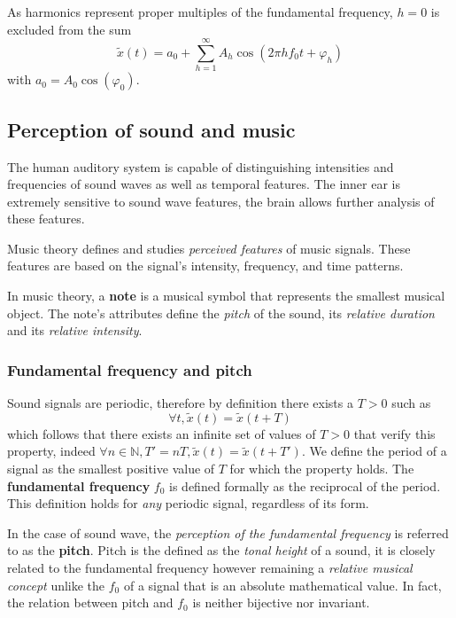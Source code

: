 \documentclass[american,]{article}
\begin{document}
As harmonics represent proper multiples of the fundamental
frequency, \(h=0\) is excluded from the sum
\[\tilde{x}(t) = a_0 + \sum_{h=1}^{\infty} A_h \cos(2\pi hf_0t + \varphi_h)\]
with \(a_0 = A_0\cos(\varphi_0)\).

\hypertarget{perception-of-sound-and-music}{%
\subsection{Perception of sound and music}\label{perception-of-sound-and-music}}

The human auditory system is capable of distinguishing
intensities and frequencies of sound waves as well as
temporal features.
The inner ear is extremely sensitive to sound wave features,
the brain allows further analysis of these features.

Music theory defines and studies \emph{perceived features}
of music signals.
These features are based on the signal's intensity,
frequency, and time patterns.

In music theory, a \textbf{note} is a musical symbol that
represents the smallest musical object.
The note's attributes define the \emph{pitch} of the sound, its
\emph{relative duration} and its \emph{relative intensity}.

\hypertarget{fundamental-frequency-and-pitch}{%
\subsubsection{Fundamental frequency and pitch}\label{fundamental-frequency-and-pitch}}

Sound signals are periodic, therefore by definition there
exists a \(T>0\) such as
\[\forall t, \tilde{x}(t)=\tilde{x}(t+T)\]
which follows that there exists an infinite set of values of \(T>0\) that verify this property, indeed
\(\forall n\in\mathbb{N}, T'=nT, \tilde{x}(t)=\tilde{x}(t+T')\).
We define the period of a signal as the smallest positive
value of \(T\) for which the property holds.
The \textbf{fundamental frequency} \(f_0\) is defined formally
as the reciprocal of the period.
This definition holds for \emph{any} periodic signal,
regardless of its form.

In the case of sound wave, the \emph{perception of the fundamental
frequency} is referred to as the \textbf{pitch}.
Pitch is the defined as the \emph{tonal height} of a sound,
it is closely related to the fundamental frequency
however remaining a \emph{relative musical concept}
unlike the \(f_0\) of a signal that is an absolute
mathematical value.
In fact, the relation between pitch and \(f_0\)
is neither bijective nor invariant.
\end{document}
